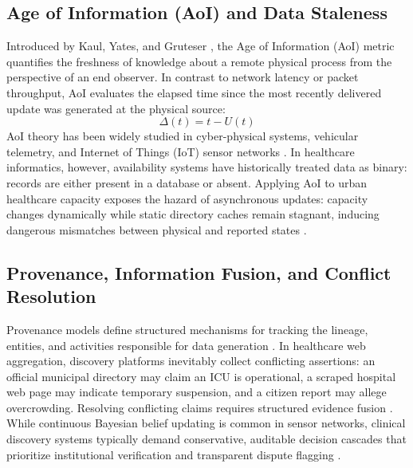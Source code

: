 \documentclass[conference]{IEEEtran}
\begin{document}
\subsection{Age of Information (AoI) and Data Staleness}
Introduced by Kaul, Yates, and Gruteser \cite{kaul2012realtime}, the Age of Information (AoI) metric quantifies the freshness of knowledge about a remote physical process from the perspective of an end observer. In contrast to network latency or packet throughput, AoI evaluates the elapsed time since the most recently delivered update was generated at the physical source:
\begin{equation}
\Delta(t) = t - U(t)
\end{equation}
AoI theory has been widely studied in cyber-physical systems, vehicular telemetry, and Internet of Things (IoT) sensor networks \cite{zou2019relative,hu2020optimal}. In healthcare informatics, however, availability systems have historically treated data as binary: records are either present in a database or absent. Applying AoI to urban healthcare capacity exposes the hazard of asynchronous updates: capacity changes dynamically while static directory caches remain stagnant, inducing dangerous mismatches between physical and reported states \cite{liu2024data,abedin2021data}.

\subsection{Provenance, Information Fusion, and Conflict Resolution}
Provenance models define structured mechanisms for tracking the lineage, entities, and activities responsible for data generation \cite{peng2026when}. In healthcare web aggregation, discovery platforms inevitably collect conflicting assertions: an official municipal directory may claim an ICU is operational, a scraped hospital web page may indicate temporary suspension, and a citizen report may allege overcrowding. Resolving conflicting claims requires structured evidence fusion \cite{feng2023examining,vermeulen2023trust}. While continuous Bayesian belief updating is common in sensor networks, clinical discovery systems typically demand conservative, auditable decision cascades that prioritize institutional verification and transparent dispute flagging \cite{vermeulen2023trust}.
\end{document}
